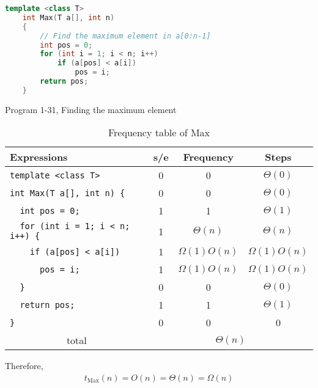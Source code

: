 \documentclass{article}
\begin{document}
\begin{lstlisting}[language=C++]
    template <class T>
    int Max(T a[], int n)
    {
        // Find the maximum element in a[0:n-1]
        int pos = 0;
        for (int i = 1; i < n; i++)
            if (a[pos] < a[i])
                pos = i;
        return pos;
    }
\end{lstlisting}
\begin{center}
    Program 1-31, Finding the maximum element
\end{center}
\begin{table}[H]
    \centering
    \begin{tabular}{|l|c|c|c|}
        \hline
        Expressions                            & s/e                               & Frequency       & Steps           \\
        \hline
        \verb|template <class T>|              & 0                                 & 0               & $\Theta(0)$     \\
        \verb|int Max(T a[], int n) {|         & 0                                 & 0               & $\Theta(0)$     \\
        \verb|  int pos = 0;|                  & 1                                 & 1               & $\Theta(1)$     \\
        \verb|  for (int i = 1; i < n; i++) {| & 1                                 & $\Theta(n)$     & $\Theta(n)$     \\
        \verb|    if (a[pos] < a[i])|          & 1                                 & $\Omega(1)O(n)$ & $\Omega(1)O(n)$ \\
        \verb|      pos = i;|                  & 1                                 & $\Omega(1)O(n)$ & $\Omega(1)O(n)$ \\
        \verb|  }|                             & 0                                 & 0               & $\Theta(0)$     \\
        \verb|  return pos;|                   & 1                                 & 1               & $\Theta(1)$     \\
        \verb|}|                               & 0                                 & 0               & 0               \\
        \hline
        \multicolumn{1}{|c|}{total}            & \multicolumn{3}{|c|}{$\Theta(n)$}                                     \\
        \hline
    \end{tabular}
    \caption{Frequency table of Max}
\end{table}
Therefore,
\begin{align}
    \boxed{t_{\text{Max}}(n) = O(n) = \Theta(n) = \Omega(n)}
\end{align}
\end{document}
